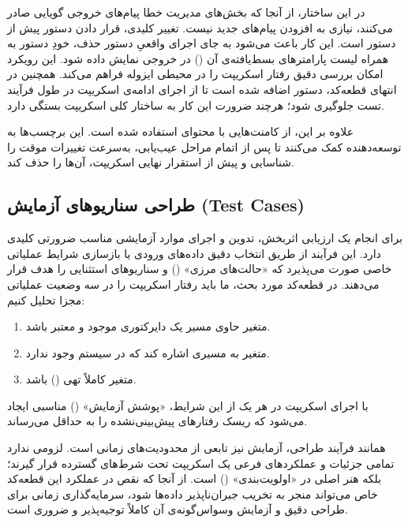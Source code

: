 در این ساختار، از آنجا که بخش‌های مدیریت خطا پیام‌های خروجی گویایی صادر می‌کنند، نیازی به افزودن پیام‌های جدید نیست. تغییر کلیدی، قرار دادن دستور  پیش از دستور  است. این کار باعث می‌شود به جای اجرای واقعیِ دستور حذف، خودِ دستور به همراه لیست پارامترهای بسط‌یافته‌ی آن () در خروجی نمایش داده شود. این رویکرد امکان بررسی دقیق رفتار اسکریپت را در محیطی ایزوله فراهم می‌کند. همچنین در انتهای قطعه‌کد، دستور  اضافه شده است تا از اجرای ادامه‌ی اسکریپت در طول فرآیند تست جلوگیری شود؛ هرچند ضرورت این کار به ساختار کلی اسکریپت بستگی دارد.

علاوه بر این، از کامنت‌هایی با محتوای  استفاده شده است. این برچسب‌ها به توسعه‌دهنده کمک می‌کنند تا پس از اتمام مراحل عیب‌یابی، به‌سرعت تغییرات موقت را شناسایی و پیش از استقرار نهایی اسکریپت، آن‌ها را حذف کند.

\subsection{طراحی سناریوهای آزمایش (Test Cases)}

برای انجام یک ارزیابی اثربخش، تدوین و اجرای موارد آزمایشی مناسب ضرورتی کلیدی دارد. این فرآیند از طریق انتخاب دقیق داده‌های ورودی یا بازسازی شرایط عملیاتی خاصی صورت می‌پذیرد که «حالت‌های مرزی» () و سناریوهای استثنایی را هدف قرار می‌دهند. در قطعه‌کد مورد بحث، ما باید رفتار اسکریپت را در سه وضعیت عملیاتی مجزا تحلیل کنیم:

\begin{enumerate}
  \item متغیر  حاوی مسیر یک دایرکتوری موجود و معتبر باشد.
  \item متغیر  به مسیری اشاره کند که در سیستم وجود ندارد.
  \item متغیر  کاملاً تهی () باشد.
\end{enumerate}

با اجرای اسکریپت در هر یک از این شرایط، «پوشش آزمایش» () مناسبی ایجاد می‌شود که ریسک رفتارهای پیش‌بینی‌نشده را به حداقل می‌رساند.

همانند فرآیند طراحی، آزمایش نیز تابعی از محدودیت‌های زمانی است. لزومی ندارد تمامی جزئیات و عملکردهای فرعی یک اسکریپت تحت شرط‌های گسترده قرار گیرند؛ بلکه هنر اصلی در «اولویت‌بندی» () است. از آنجا که نقص در عملکرد این قطعه‌کد خاص می‌تواند منجر به تخریب جبران‌ناپذیر داده‌ها شود، سرمایه‌گذاری زمانی برای طراحی دقیق و آزمایش وسواس‌گونه‌ی آن کاملاً توجیه‌پذیر و ضروری است.

